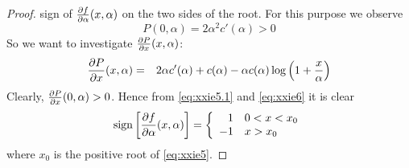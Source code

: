 \begin{subappendices}
\begin{proof}
  sign of ${\partial f \over \partial \alpha}(x, \alpha)$ on the two sides of
  the root. For this purpose we observe
  \begin{equation}
    \label{eq:xxie5.1}
    P(0, \alpha) = 2 \alpha^2 c'(\alpha) > 0
  \end{equation}
  So we want to investigate ${\partial P \over \partial x}(x, \alpha)$:
  \begin{eqnarray}
    {\partial P \over \partial x}(x, \alpha) &=&
    2 \alpha c'(\alpha) + c(\alpha) - \alpha c(\alpha) \log\left(
      1 + {x \over \alpha}
    \right)
    \label{eq:xxie6}
  \end{eqnarray}
  Clearly, $\frac{\partial P}{\partial x}(0, \alpha) > 0$. Hence from
  \eqref{eq:xxie5.1} and
  \eqref{eq:xxie6} it is clear
  \begin{equation*}
    \text{sign}\left[
      {\partial f \over \partial\alpha}(x, \alpha)
    \right]
    = \left\{
    \begin{array}{rl}
      1 & 0 < x < x_0 \\
      -1 & x > x_0
    \end{array}
    \right.
  \end{equation*}
  where $x_0$ is the positive root of \eqref{eq:xxie5}.
\end{proof}


\end{subappendices}
